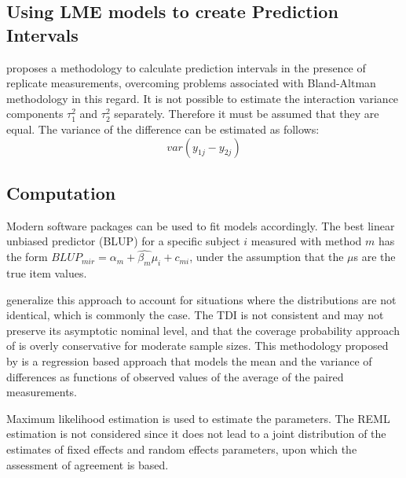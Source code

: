 \documentclass{report}
\begin{document}
	
	\subsection{Using LME models to create Prediction Intervals}
	
	
	
	
	\citet{BXC2008} proposes a methodology to calculate prediction
	intervals in the presence of replicate measurements, overcoming
	problems associated with Bland-Altman methodology in this regard.
	It is not possible to estimate the interaction variance components
	$\tau^{2}_{1}$ and $\tau^{2}_{2}$ separately. Therefore it must be
	assumed that they are equal. The variance of the difference can be
	estimated as follows:
	\begin{equation}
	var(y_{1j}-y_{2j})
	\end{equation}
	
	\subsection{Computation} Modern software
	packages can be used to fit models accordingly. The best linear
	unbiased predictor (BLUP) for a specific subject $i$ measured with
	method $m$ has the form $BLUP_{mir} = \hat{\alpha_{m}} +
	\hat{\beta_{m}}\mu_{i} + c_{mi}$, under the assumption that the
	$\mu$s are the true item values.
	
	
	
	
	\citet{pkcng} generalize this approach to account for situations
	where the distributions are not identical, which is commonly the
	case. The TDI is not consistent and may not preserve its
	asymptotic nominal level, and that the coverage probability
	approach of \citet{lin2002} is overly conservative for moderate
	sample sizes. This methodology proposed by \citet{pkcng} is a
	regression based approach that models the mean and the variance of
	differences as functions of observed values of the average of the
	paired measurements.
	
	Maximum likelihood estimation is used to estimate the parameters.
	The REML estimation is not considered since it does not lead to a
	joint distribution of the estimates of fixed effects and random
	effects parameters, upon which the assessment of agreement is
	based.
	
	
	
\end{document}
